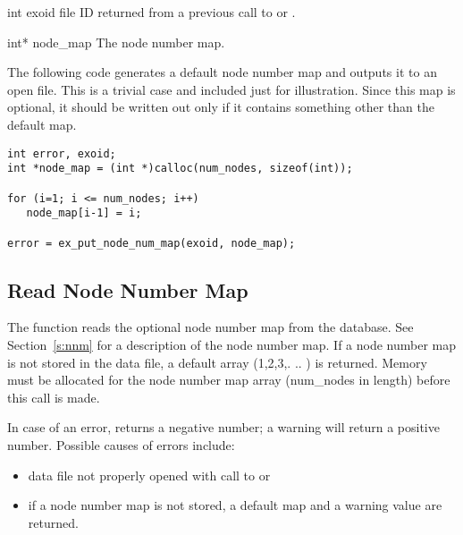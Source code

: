 
\begin{parameters}
\item[{int exoid \R{}}]
\exo{} file ID returned from a previous call to 
or .

\item[{int* node_map \R{}}]
The node number map.
\end{parameters}

The following code generates a default node number map and outputs it
to an open \exo{} file. This is a trivial case and included just for
illustration. Since this map is optional, it should be written out
only if it contains something other than the default map.

\begin{lstlisting}
int error, exoid;
int *node_map = (int *)calloc(num_nodes, sizeof(int));

for (i=1; i <= num_nodes; i++)
   node_map[i-1] = i;

error = ex_put_node_num_map(exoid, node_map);
\end{lstlisting}

\subsection{Read Node Number Map}

The function  reads the optional node
number map from the database. See Section~\ref{s:nnm} for a
description of the node number map. If a node number map is
not stored in the data file, a default array (1,2,3,. .. )
is returned. Memory must be allocated for the node number map array
({num_nodes} in length) before this call is made.

In case of an error,  returns a
negative number; a warning will return a positive number. Possible
causes of errors include:

\begin{itemize}
 \item data file not properly opened with call to 
 or 

 \item if a node number map is not stored, a default map
and a warning value are returned.
\end{itemize}




